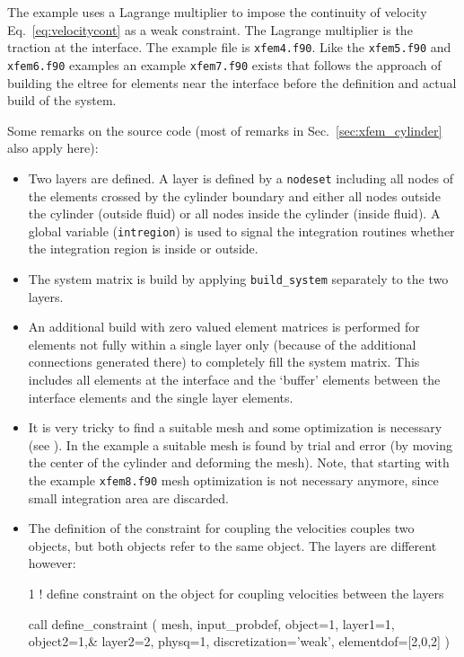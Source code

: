 The example uses a Lagrange multiplier to impose the continuity of
velocity Eq.~\eqref{eq:velocitycont} as a weak constraint. The Lagrange
multiplier is the traction at the interface.
The example file is \texttt{xfem4.f90}.
Like the
\texttt{xfem5.f90} and \texttt{xfem6.f90} examples 
an example \texttt{xfem7.f90} exists that
follows the approach of building the eltree for elements near the interface
before the definition and actual build of the system.

Some remarks on the source code (most of remarks in Sec.~\ref{sec:xfem_cylinder}
also apply here):
\begin{itemize}
   \item Two layers are defined.
A layer is defined by a
\texttt{nodeset} including all nodes
of the elements crossed by the cylinder boundary and either
 all nodes outside the cylinder (outside fluid) or 
all nodes inside the cylinder (inside fluid).
A global variable (\texttt{intregion}) is used to signal the
integration routines whether the integration region is inside or outside.
   \item The system matrix is build by applying \texttt{build\_system} separately
to the two layers.
\item
An additional build 
with zero valued element matrices is performed for elements not
fully within a single layer only
(because of the additional connections generated there) to
completely fill the system matrix. This includes all
elements at the interface and the `buffer' elements
between the interface elements and the single layer elements.
\item 
It is very tricky to find a suitable mesh and some optimization is necessary
(see \cite{Choi10}). In the example a suitable mesh is found by trial and error (by moving the center
of the cylinder and deforming the mesh).
Note, that starting with the example \texttt{xfem8.f90} mesh optimization
is not necessary anymore, since small integration area are discarded.
\item
The definition of the constraint for coupling the velocities couples two
objects, but both objects refer to the same object. The layers are different however:
\begin{listing}{1}
! define constraint on the object for coupling velocities between the layers

  call define_constraint ( mesh, input_probdef, object=1, layer1=1, object2=1,&
    layer2=2, physq=1, discretization='weak', elementdof=[2,0,2] )
\end{listing}

\end{itemize}

